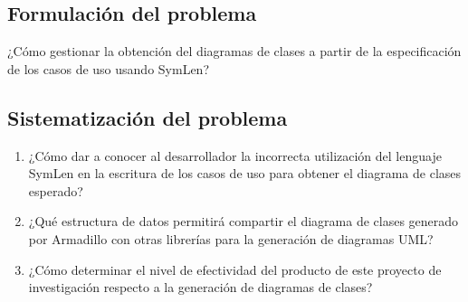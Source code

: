 \subsection{Formulación del problema}



¿Cómo gestionar la obtención del diagramas de clases a partir de la especificación de los casos de uso usando SymLen?

\subsection{Sistematización del problema}

\sloppy
\begin{enumerate}
	
	\item ¿Cómo dar a conocer al desarrollador la incorrecta utilización del lenguaje SymLen en la escritura de los casos de uso para obtener el diagrama de clases esperado?
	
	 \item  ¿Qué estructura de datos permitirá compartir el diagrama de clases generado por Armadillo con otras librerías para la generación de diagramas UML?
	
	\item ¿Cómo determinar el nivel de efectividad del producto de este proyecto de investigación respecto a la generación de diagramas de clases?
\end{enumerate}

